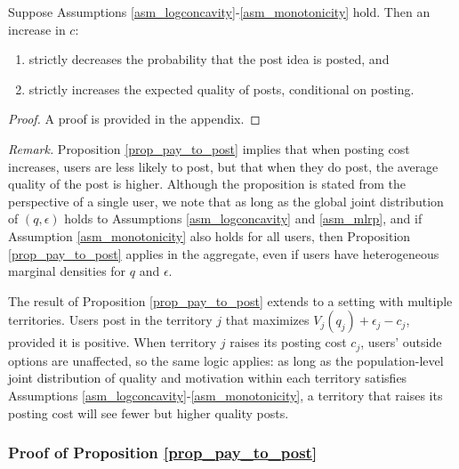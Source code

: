 \begin{proposition} \label{prop_pay_to_post}
Suppose Assumptions \ref{asm_logconcavity}-\ref{asm_monotonicity} hold. Then an increase in $c$:
\begin{enumerate}[label=(\roman*)]
\item strictly decreases the probability that the post idea is posted, and
\item strictly increases the expected quality of posts, conditional on posting.
\end{enumerate}
\end{proposition}

\begin{proof}
A proof is provided in the appendix.
\end{proof}

\noindent \emph{Remark.} Proposition \ref{prop_pay_to_post} implies that when posting cost increases, users are less likely to post, but that when they do post, the average quality of the post is higher. Although the proposition is stated from the perspective of a single user, we note that as long as the global joint distribution of $(q,\epsilon)$ holds to Assumptions \ref{asm_logconcavity} and \ref{asm_mlrp}, and if Assumption \ref{asm_monotonicity} also holds for all users, then Proposition \ref{prop_pay_to_post} applies in the aggregate, even if users have heterogeneous marginal densities for $q$ and $\epsilon$. 

The result of Proposition \ref{prop_pay_to_post} extends to a setting with multiple territories. Users post in the territory $j$ that maximizes $V_j(q_j) + \epsilon_j - c_j$, provided it is positive. When territory $j$ raises its posting cost $c_j$, users' outside options are unaffected, so the same logic applies: as long as the population-level joint distribution of quality and motivation within each territory satisfies Assumptions \ref{asm_logconcavity}-\ref{asm_monotonicity}, a territory that raises its posting cost will see fewer but higher quality posts. \hfill \qedsymbol




\subsubsection*{Proof of Proposition \ref{prop_pay_to_post}}

